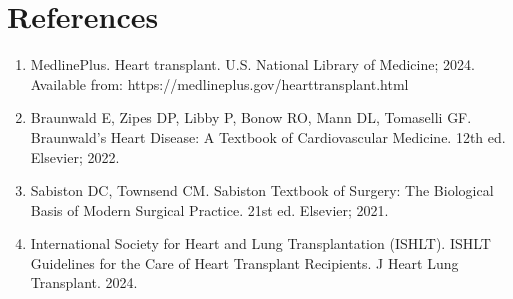 \section*{References}
\begin{enumerate}
  \item MedlinePlus. Heart transplant. U.S. National Library of Medicine; 2024. Available from: https://medlineplus.gov/hearttransplant.html
  
  \item Braunwald E, Zipes DP, Libby P, Bonow RO, Mann DL, Tomaselli GF. Braunwald's Heart Disease: A Textbook of Cardiovascular Medicine. 12th ed. Elsevier; 2022.
  
  \item Sabiston DC, Townsend CM. Sabiston Textbook of Surgery: The Biological Basis of Modern Surgical Practice. 21st ed. Elsevier; 2021.
  
  \item International Society for Heart and Lung Transplantation (ISHLT). ISHLT Guidelines for the Care of Heart Transplant Recipients. J Heart Lung Transplant. 2024.
\end{enumerate}

\clearpage
